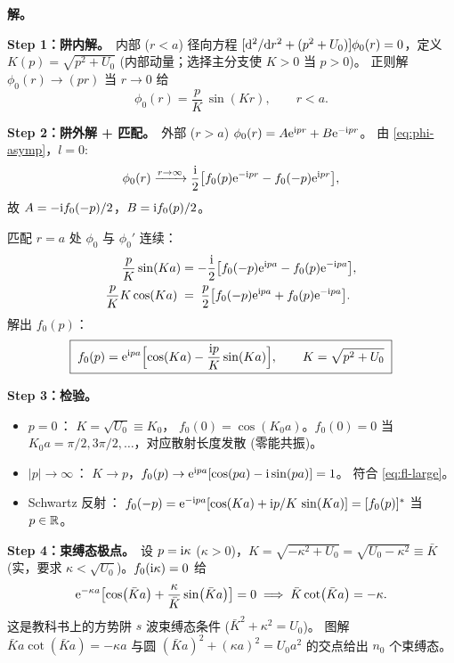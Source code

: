 \textbf{解。}\,

\textbf{Step 1：阱内解。}\,
内部 ($r<a$) 径向方程
$[\mathrm{d}^2/\mathrm{d} r^2+(p^2+U_0)]\phi_0(r)=0$，定义
$K(p)=\sqrt{p^2+U_0}$ (内部动量；选择主分支使 $K>0$ 当 $p>0$)。
正则解 $\phi_0(r)\to (pr)$ 当 $r\to 0$ 给
\begin{equation}
\phi_0(r)=\frac{p}{K}\,\sin(Kr),\qquad r<a.
\label{eq:anlyt-sqwell-inner}
\end{equation}

\textbf{Step 2：阱外解 + 匹配。}\,
外部 ($r>a$) $\phi_0(r)=A\mathrm{e}^{\mathrm{i} pr}+B\mathrm{e}^{-\mathrm{i} pr}$。
由 \eqref{eq:phi-asymp}，$l=0$:
\begin{equation}
\phi_0(r)\xrightarrow{r\to\infty}\frac{\mathrm{i}}{2}\bigl[f_0(p)\mathrm{e}^{-\mathrm{i} pr}-f_0(-p)\mathrm{e}^{\mathrm{i} pr}\bigr],
\label{eq:anlyt-sqwell-asymp}
\end{equation}
故 $A=-\mathrm{i} f_0(-p)/2$，$B=\mathrm{i} f_0(p)/2$。

匹配 $r=a$ 处 $\phi_0$ 与 $\phi_0'$ 连续：
\begin{align}
\frac{p}{K}\sin(Ka) &= -\frac{\mathrm{i}}{2}\bigl[f_0(-p)\mathrm{e}^{\mathrm{i} pa}-f_0(p)\mathrm{e}^{-\mathrm{i} pa}\bigr],
\label{eq:anlyt-sqwell-match1}\\
\frac{p}{K}K\cos(Ka)\;&=\;\frac{p}{2}\bigl[f_0(-p)\mathrm{e}^{\mathrm{i} pa}+f_0(p)\mathrm{e}^{-\mathrm{i} pa}\bigr].
\label{eq:anlyt-sqwell-match2}
\end{align}
解出 $f_0(p)$：
\begin{equation}
\boxed{\;f_0(p)=\mathrm{e}^{\mathrm{i} pa}\Bigl[\cos(Ka)-\frac{\mathrm{i} p}{K}\sin(Ka)\Bigr],
\qquad K=\sqrt{p^2+U_0}\;}
\label{eq:anlyt-sqwell-f0}
\end{equation}

\textbf{Step 3：检验。}\,
\begin{itemize}
\item $p=0$\,： $K=\sqrt{U_0}\equiv K_0$，
$f_0(0)=\cos(K_0 a)$。$f_0(0)=0$ 当 $K_0 a=\pi/2,3\pi/2,\ldots$，对应散射长度发散
(零能共振)。
\item $|p|\to\infty$\,： $K\to p$，$f_0(p)\to\mathrm{e}^{\mathrm{i} pa}[\cos(pa)-\mathrm{i}\sin(pa)]=1$。
符合 \eqref{eq:fl-large}。
\item Schwartz 反射\,： $f_0(-p)=\mathrm{e}^{-\mathrm{i} pa}[\cos(Ka)+\mathrm{i} p/K\,\sin(Ka)]=[f_0(p)]^*$ 当 $p\in\mathbb{R}$。\checkmark
\end{itemize}

\textbf{Step 4：束缚态极点。}\,
设 $p=\mathrm{i}\kappa$ ($\kappa>0$)，$K=\sqrt{-\kappa^2+U_0}=\sqrt{U_0-\kappa^2}\equiv\bar K$
(实，要求 $\kappa<\sqrt{U_0}$)。$f_0(\mathrm{i}\kappa)=0$ 给
\begin{equation}
\mathrm{e}^{-\kappa a}\bigl[\cos(\bar K a)+\frac{\kappa}{\bar K}\sin(\bar K a)\bigr]=0
\;\Longrightarrow\;\bar K\cot(\bar K a)=-\kappa.
\label{eq:anlyt-sqwell-bound}
\end{equation}
这是教科书上的方势阱 $s$ 波束缚态条件 ($\bar K^2+\kappa^2=U_0$)。
图解 $\bar Ka\cot(\bar Ka)=-\kappa a$ 与圆 $(\bar Ka)^2+(\kappa a)^2=U_0 a^2$
的交点给出 $n_0$ 个束缚态。

